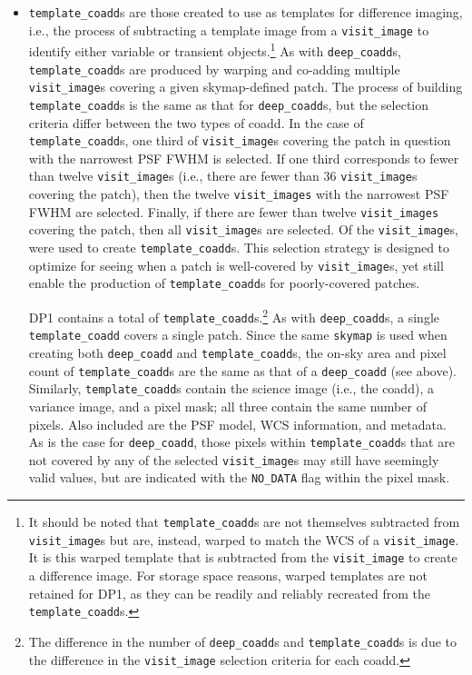 \begin{itemize}
\item \texttt{template\_coadd}s \citep{10.71929/rubin/2570314} are those created to use as templates for difference imaging, i.e., the process of subtracting a template image from a \texttt{visit\_image} to identify either variable or \gls{transient} objects.\footnote{It should be noted that \texttt{template\_coadd}s are not themselves subtracted from \texttt{visit\_image}s but are, instead, warped to match the \gls{WCS} of a \texttt{visit\_image}.
It is this warped template that is subtracted from the \texttt{visit\_image} to create a difference image.
For storage space reasons, warped templates are not retained for \gls{DP1}, as they can be readily and reliably recreated from the \texttt{template\_coadd}s.}
As with \texttt{deep\_coadd}s, \texttt{template\_coadd}s are produced by warping and co-adding multiple \texttt{visit\_image}s covering a given skymap-defined \gls{patch}.
The process of building \texttt{template\_coadd}s is the same as that for \texttt{deep\_coadd}s, but the selection criteria differ between the two types of coadd.
In the case of \texttt{template\_coadd}s, one third of \texttt{visit\_image}s covering the \gls{patch} in question with the narrowest \gls{PSF} \gls{FWHM} is selected.
If one third corresponds to fewer than twelve \texttt{visit\_image}s (i.e., there are fewer than 36 \texttt{visit\_image}s covering the \gls{patch}), then the twelve \texttt{visit\_images} with the narrowest \gls{PSF} \gls{FWHM} are selected.
Finally, if there are fewer than twelve \texttt{visit\_images} covering the \gls{patch}, then all \texttt{visit\_image}s are selected. 
Of the \nvisitimages \texttt{visit\_image}s, \ntemplatecoaddvisitimages were used to create \texttt{template\_coadd}s.
This selection strategy is designed to optimize for \gls{seeing} when a \gls{patch} is well-covered by \texttt{visit\_image}s, yet still enable the production of \texttt{template\_coadd}s for poorly-covered patches.


DP1 contains a total of \ntemplatecoadds \texttt{template\_coadd}s.\footnote{The difference in the number of \texttt{deep\_coadd}s and \texttt{template\_coadd}s is due to the difference in the \texttt{visit\_image} selection criteria for each coadd.}
As with \texttt{deep\_coadd}s, a single \texttt{template\_coadd} covers a single \gls{patch}.
Since the same \texttt{skymap} is used when creating both \texttt{deep\_coadd} and \texttt{template\_coadd}s, the on-sky area and pixel count of \texttt{template\_coadd}s are the same as that of a \texttt{deep\_coadd} (see above).
Similarly, \texttt{template\_coadd}s contain the science image (i.e., the coadd), a variance image, and a pixel mask; all three contain the same number of pixels.
Also included are the \gls{PSF} model, \gls{WCS} information, and \gls{metadata}.
As is the case for \texttt{deep\_coadd}, those pixels within \texttt{template\_coadd}s that are not covered by any of the selected \texttt{visit\_image}s may still have seemingly valid values, but are indicated with the \texttt{NO\_DATA} flag within the pixel mask.


\end{itemize}
